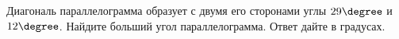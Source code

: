 \begin{ex}
	\begin{condition}
		Диагональ параллелограмма образует с двумя его сторонами углы \( 29 \degree \) и \( 12 \degree \). Найдите больший угол параллелограмма. Ответ дайте в градусах.
	\end{condition}
\end{ex}